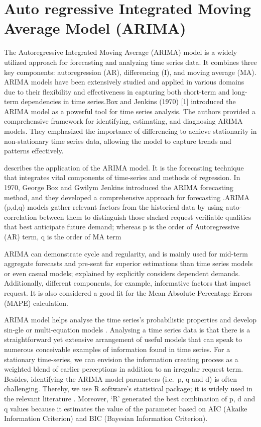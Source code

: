 \documentclass[
  authoryear,
  preprint,
  3p]{elsarticle}
\begin{document}
\hypertarget{auto-regressive-integrated-moving-average-model-arima}{%
\section{Auto regressive Integrated Moving Average Model
(ARIMA)}\label{auto-regressive-integrated-moving-average-model-arima}}

The Autoregressive Integrated Moving Average (ARIMA) model is a widely
utilized approach for forecasting and analyzing time series data. It
combines three key components: autoregression (AR), differencing (I),
and moving average (MA). ARIMA models have been extensively studied and
applied in various domains due to their flexibility and effectiveness in
capturing both short-term and long-term dependencies in time series.Box
and Jenkins (1970) {[}1{]} introduced the ARIMA model as a powerful tool
for time series analysis. The authors provided a comprehensive framework
for identifying, estimating, and diagnosing ARIMA models. They
emphasized the importance of differencing to achieve stationarity in
non-stationary time series data, allowing the model to capture trends
and patterns effectively.

\citep{chase2013demand} describes the application of the ARIMA model. It
is the forecasting technique that integrates vital components of
time-series and methods of regression. In 1970, George Box and Gwilym
Jenkins introduced the ARIMA forecasting method, and they developed a
comprehensive approach for forecasting \citep{chase2013demand}.ARIMA
(p,d,q) models gather relevant factors from the historical data by using
auto-correlation between them to distinguish those slacked request
verifiable qualities that best anticipate future demand; whereas p is
the order of Autoregressive (AR) term, q is the order of MA term

ARIMA can demonstrate cycle and regularity, and is mainly used for
mid-term aggregate forecasts and pre-sent far superior estimations than
time series models or even casual models; explained by
\citep{stadtler2014supply} explicitly considers dependent demands.
Additionally, different components, for example, informative factors
that impact request. It is also considered a good fit for the Mean
Absolute Percentage Errors (MAPE) calculation.

ARIMA model helps analyse the time series's probabilistic properties and
develop sin-gle or multi-equation models \citep{moritz2015comparison}.
Analysing a time series data is that there is a straightforward yet
extensive arrangement of useful models that can speak to numerous
conceivable examples of information found in time series. For a
stationary time-series, we can envision the information creating process
as a weighted blend of earlier perceptions in addition to an irregular
request term. Besides, identifying the ARIMA model parameters (i.e.~p, q
and d) is often challenging. Thereby, we use R software's statistical
package; it is widely used in the relevant literature
\citep{bokde2016psf, dhamo2010using}. Moreover, `R' generated the best
combination of p, d and q values because it estimates the value of the
parameter based on AIC (Akaike Information Criterion) and BIC (Bayesian
Information Criterion).
\end{document}
